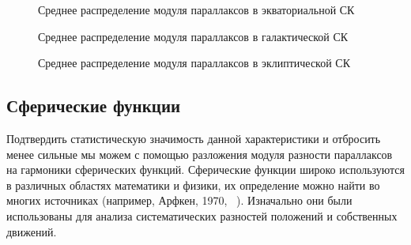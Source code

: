 \documentclass[14pt]{article} %
\begin{document}
\begin{figure}[h!]
\caption{Среднее распределение модуля параллаксов в экваториальной СК }
\label{img:sf_ra}
\end{figure}

\begin{figure}[h!]
\caption{Среднее распределение модуля параллаксов в галактической СК}
\label{img:sf_l}
\end{figure}

\begin{figure}[h!]
\caption{Среднее распределение модуля параллаксов в эклиптической СК}
\label{img:sf_lo}
\end{figure}


\subsection{Сферические функции}\label{sistem}  
Подтвердить статистическую значимость данной характеристики и отбросить менее сильные мы можем с помощью разложения модуля разности параллаксов на гармоники сферических функций. Сферические функции широко используются в различных областях математики и физики, их определение можно найти во многих источниках (например, Арфкен, 1970, ~\cite{book:arfken}). Изначально они были использованы для анализа систематических разностей положений и собственных движений. 
\end{document}

